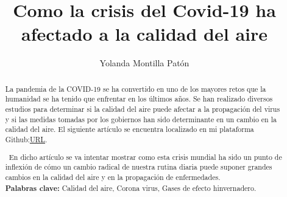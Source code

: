\documentclass[a4paper,11pt]{article}
\begin{document}
\title{Como la crisis del Covid-19 ha afectado a la calidad del aire}
\author{Yolanda Montilla Patón}
\maketitle


\begin{abstract}
 La pandemia de la COVID-19 se ha convertido en uno de los mayores retos que la humanidad se ha tenido que enfrentar en los últimos años. Se han realizado diversos estudios para determinar si la calidad del aire puede afectar a la propagación del virus y si las medidas tomadas por los gobiernos han sido determinante en un cambio en la calidad del aire. El siguiente artículo se encuentra localizado en mi plataforma Github:\href{https://github.com/yolandaMontilla/PROYECTO_FINAL.git}{URL}.

\ En dicho artículo se va intentar mostrar como esta crisis mundial ha sido un punto de inflexión de cómo un cambio radical de nuestra rutina diaria puede suponer grandes cambios en la calidad del aire y en la propagación de enfermedades.
\textbf{\\ Palabras clave:}
Calidad del aire, Corona virus, Gases de efecto hinvernadero.

\end{abstract}
\end{document}

